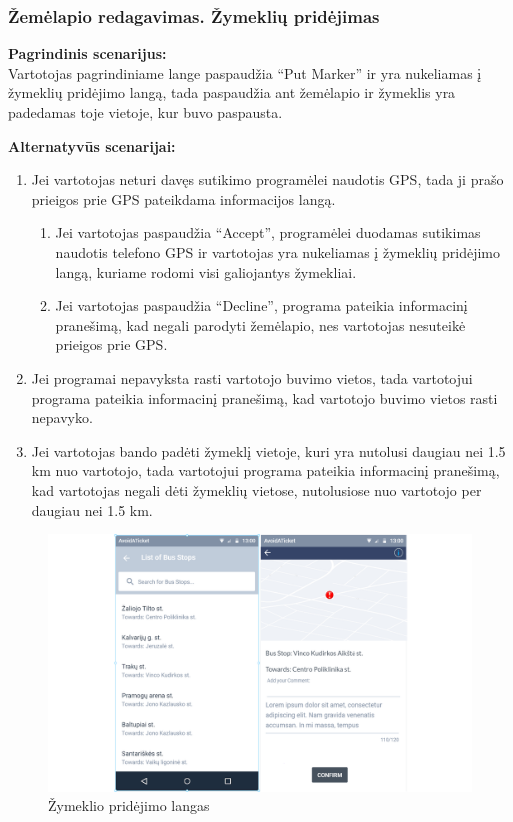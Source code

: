 \documentclass{VUMIFPSkursinis}
\begin{document}
\subsubsection{Žemėlapio redagavimas. Žymeklių pridėjimas}
	\textbf{Pagrindinis scenarijus:}\\
	Vartotojas pagrindiniame lange paspaudžia “Put Marker” ir yra nukeliamas į žymeklių pridėjimo langą, tada paspaudžia ant žemėlapio ir žymeklis yra padedamas toje vietoje, kur buvo paspausta.

	\textbf{Alternatyvūs scenarijai:}
	\begin{enumerate}[itemsep=-2mm]
		\item Jei vartotojas neturi davęs sutikimo programėlei naudotis GPS, tada ji prašo prieigos prie GPS pateikdama informacijos langą.
		\begin{enumerate}[itemsep=-2mm]
			\item Jei vartotojas paspaudžia “Accept”, programėlei duodamas sutikimas naudotis telefono GPS ir vartotojas yra nukeliamas į žymeklių pridėjimo langą, kuriame rodomi visi galiojantys žymekliai.
			\item Jei vartotojas paspaudžia “Decline”, programa pateikia informacinį pranešimą, kad negali parodyti žemėlapio, nes vartotojas nesuteikė prieigos prie GPS.
		\end{enumerate} 
		\item Jei programai nepavyksta rasti vartotojo buvimo vietos, tada vartotojui programa pateikia informacinį pranešimą, kad vartotojo buvimo vietos rasti nepavyko.
		\item Jei vartotojas bando padėti žymeklį vietoje, kuri yra nutolusi daugiau nei 1.5 km nuo vartotojo, tada vartotojui programa pateikia informacinį pranešimą, kad vartotojas negali dėti žymeklių vietose, nutolusiose nuo vartotojo per daugiau nei 1.5 km.
	\end{enumerate} 
	\begin{figure}[H]
				\centering
				\includegraphics[scale=0.2]{img/mockup_AddMarker}
				\caption{Žymeklio pridėjimo langas}
				\label{img:Žymeklio pridėjimo langas}
			\end{figure}
\end{document}
